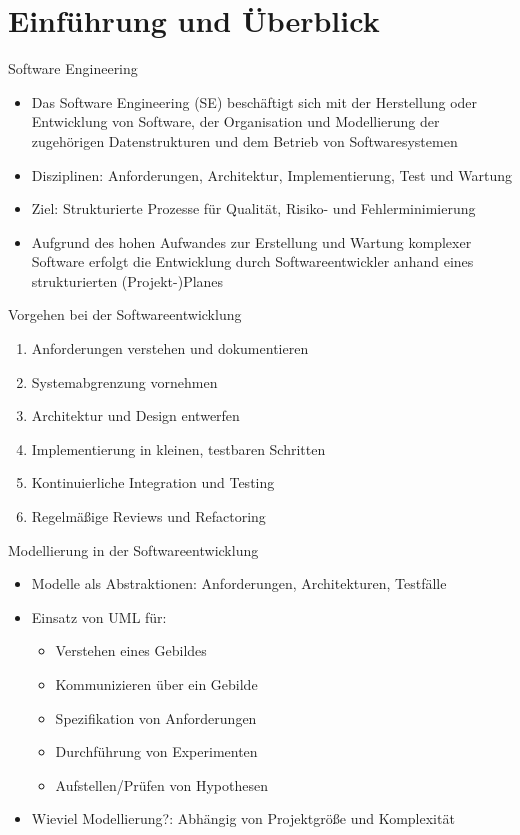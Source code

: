 \section{Einführung und Überblick}

\begin{definition}{Software Engineering}
\begin{itemize}
    \item Das Software Engineering (SE) beschäftigt sich mit der Herstellung oder Entwicklung von Software, der Organisation und Modellierung der zugehörigen Datenstrukturen und dem Betrieb von Softwaresystemen
    \item Disziplinen: Anforderungen, Architektur, Implementierung, Test und Wartung
    \item Ziel: Strukturierte Prozesse für Qualität, Risiko- und Fehlerminimierung
    \item Aufgrund des hohen Aufwandes zur Erstellung und Wartung komplexer Software erfolgt die Entwicklung durch Softwareentwickler anhand eines strukturierten (Projekt-)Planes
\end{itemize}
\end{definition}

\begin{KR}{Vorgehen bei der Softwareentwicklung}
\begin{enumerate}
    \item Anforderungen verstehen und dokumentieren
    \item Systemabgrenzung vornehmen
    \item Architektur und Design entwerfen
    \item Implementierung in kleinen, testbaren Schritten
    \item Kontinuierliche Integration und Testing
    \item Regelmäßige Reviews und Refactoring
\end{enumerate}
\end{KR}

\begin{definition}{Modellierung in der Softwareentwicklung}
\begin{itemize}
    \item Modelle als Abstraktionen: Anforderungen, Architekturen, Testfälle
    \item Einsatz von UML für:
    \begin{itemize}
        \item Verstehen eines Gebildes
        \item Kommunizieren über ein Gebilde
        \item Spezifikation von Anforderungen
        \item Durchführung von Experimenten
        \item Aufstellen/Prüfen von Hypothesen
    \end{itemize}
    \item Wieviel Modellierung?: Abhängig von Projektgröße und Komplexität
\end{itemize}
\end{definition}

